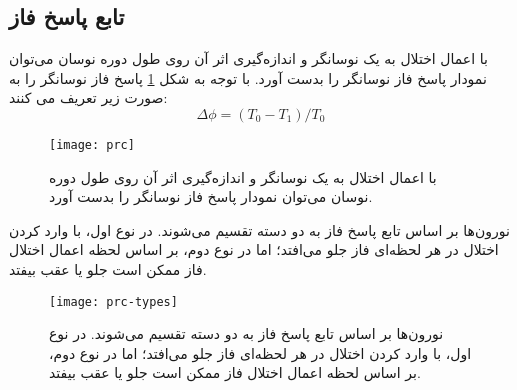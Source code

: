 \subsection{تابع پاسخ فاز}
با اعمال اختلال به یک نوسانگر و اندازه‌گیری اثر آن روی طول دوره نوسان می‌توان نمودار پاسخ فاز
 نوسانگر را بدست آورد. با توجه به شکل
 \ref{fig:prc}
پاسخ فاز نوسانگر را به صورت زیر تعریف می کنند:
\begin{equation}
\Delta \phi = (T_0 - T_1)/T_0
\label{eq:prc}
\end{equation}


\begin{figure}[h!]
	\centering
	\texttt{[image: prc]}
    \caption{
با اعمال اختلال به یک نوسانگر و اندازه‌گیری اثر آن روی طول دوره نوسان می‌توان نمودار پاسخ فاز نوسانگر را بدست آورد.
\label{fig:prc}
    }
\end{figure}

  نورون‌ها بر اساس تابع پاسخ فاز به دو دسته تقسیم می‌شوند. در نوع اول، با وارد کردن اختلال در هر لحظه‌ای فاز جلو می‌افتد؛ اما در نوع دوم، بر اساس لحظه اعمال اختلال فاز ممکن است جلو یا عقب بیفتد.
  
\begin{figure}
	\centering
	\texttt{[image: prc-types]}
    \caption{
  نورون‌ها بر اساس تابع پاسخ فاز به دو دسته تقسیم می‌شوند. در نوع اول، با وارد کردن اختلال در هر لحظه‌ای فاز جلو می‌افتد؛ اما در نوع دوم، بر اساس لحظه اعمال اختلال فاز ممکن است جلو یا عقب بیفتد.
    }
\end{figure}

  
  
  
  
  
  
  
  
  
  
  
  
  
  
  
  
  
  
  
  
  
  